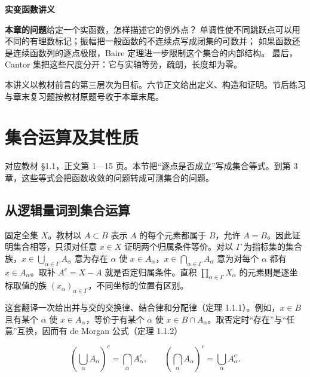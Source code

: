 \documentclass[11pt,a4paper]{article}
\begin{document}
\begin{center}
{\LARGE\bfseries 实变函数讲义\par}
\vspace{8pt}{\large 第一章\quad 集合运算、集合的势、集类\par}
\vspace{6pt}{\small 依徐森林、薛春华《实变函数论》\quad 教材第 1—97 页\par}
\end{center}
\vspace{8pt}
\noindent\textbf{本章的问题}\quad 给定一个实函数，怎样描述它的例外点？
单调性使不同跳跃点可以用不同的有理数标记；振幅把一般函数的不连续点写成闭集的可数并；
如果函数还是连续函数列的逐点极限，Baire 定理进一步限制这个集合的内部结构。
最后，Cantor 集把这些尺度分开：它与实轴等势，疏朗，长度却为零。
\par
本讲义以教材前言的第三层次为目标。六节正文给出定义、构造和证明。节后练习与章末复习题按教材原题号收于本章末尾。
\tableofcontents
\section{集合运算及其性质}

对应教材 §1.1，正文第 1---15 页。本节把``逐点是否成立''写成集合等式。到第 3 章，这些等式会把函数收敛的问题转成可测集合的问题。

\subsection{从逻辑量词到集合运算}

固定全集 \(X\)。教材以 \(A\subset B\) 表示 \(A\) 的每个元素都属于 \(B\)，允许 \(A=B\)。因此证明集合相等，只须对任意 \(x\in X\) 证明两个归属条件等价。对以 \(\Gamma\) 为指标集的集合族，\(x\in\bigcup_{\alpha\in\Gamma}A_\alpha\) 意为存在 \(\alpha\) 使 \(x\in A_\alpha\)，\(x\in\bigcap_{\alpha\in\Gamma}A_\alpha\) 意为对每个 \(\alpha\) 都有 \(x\in A_\alpha\)。取补 \(A^c=X-A\) 就是否定归属条件。直积 \(\prod_{\alpha\in\Gamma}X_\alpha\) 的元素则是逐坐标取值的族 \((x_\alpha)_{\alpha\in\Gamma}\)，不同坐标的位置有区别。

这套翻译一次给出并与交的交换律、结合律和分配律（定理 1.1.1）。例如，\(x\in B\) 且有某个 \(\alpha\) 使 \(x\in A_\alpha\)，等价于有某个 \(\alpha\) 使 \(x\in B\cap A_\alpha\)。取否定时``存在''与``任意''互换，因而有 de Morgan 公式（定理 1.1.2）

\[
\left(\bigcup_\alpha A_\alpha\right)^c=\bigcap_\alpha A_\alpha^c,\qquad
\left(\bigcap_\alpha A_\alpha\right)^c=\bigcup_\alpha A_\alpha^c.
\]
\end{document}
